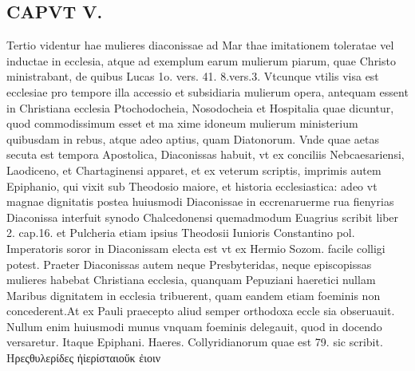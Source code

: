 \documentclass{article}
\begin{document}
\begin{pages}
\section*{CAPVT  V. }  \pend\pstart Tertio videntur hae mulieres diaconissae ad Mar thae imitationem toleratae vel inductae in ecclesia, atque ad exemplum earum mulierum piarum, quae Christo ministrabant, de quibus Lucas 1o. vers. 41. 8.vers.3. Vtcunque vtilis visa est ecclesiae pro tempore illa accessio et subsidiaria mulierum opera, antequam essent in Christiana ecclesia Ptochodocheia, Nosodocheia et Hospitalia quae dicuntur, quod commodissimum esset et ma xime idoneum mulierum ministerium quibusdam in rebus, atque adeo aptius, quam Diatonorum.  \pend\pstart Vnde quae aetas secuta est tempora Apostolica, Diaconissas habuit, vt ex conciliis Nebcaesariensi, Laodiceno, et Chartaginensi apparet, et ex veterum scriptis, imprimis autem Epiphanio, qui vixit sub Theodosio maiore, et historia ecclesiastica: adeo vt magnae dignitatis postea huiusmodi Diaconissae in eccrenaruerme rua fienyrias Diaconissa interfuit synodo Chalcedonensi quemadmodum Euagrius scribit liber 2. cap.16. et Pulcheria etiam ipsius Theodosii Iunioris Constantino pol. Imperatoris soror in Diaconissam electa est vt ex Hermio Sozom. facile colligi potest.  \pend\pstart Praeter Diaconissas autem neque Presbyteridas, neque episcopissas mulieres habebat Christiana ecclesia, quanquam Pepuziani haeretici nullam Maribus dignitatem in ecclesia tribuerent, quam eandem etiam foeminis non concederent.At ex Pauli praecepto aliud semper orthodoxa eccle sia obseruauit. Nullum enim huiusmodi munus vnquam foeminis delegauit, quod in docendo versaretur. Itaque Epiphani. Haeres. Collyridianorum quae est 79. sic scribit. Hρεςθυλερίδες ἠἰερίσταιοὔκ ἐιοιν  \pend

\end{pages}
\end{document}
